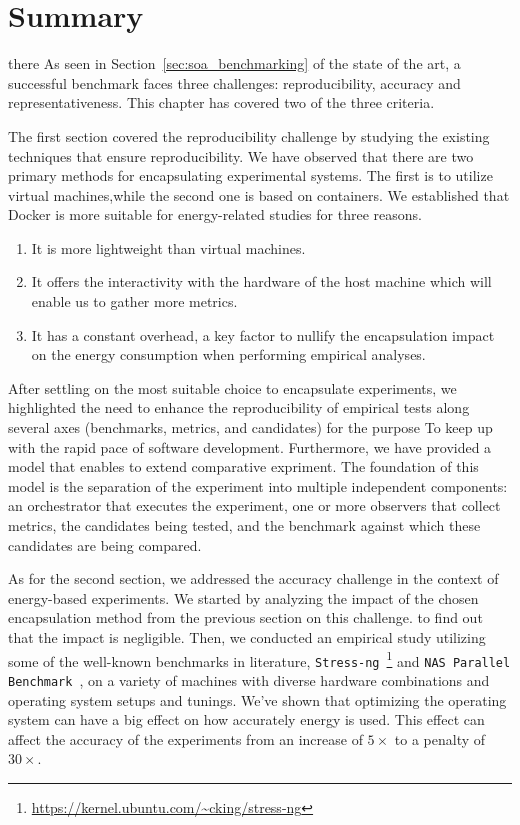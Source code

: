 \section{Summary}
there As seen in Section~\cref{sec:soa_benchmarking} of the state of the art, a successful benchmark faces three challenges: reproducibility, accuracy and representativeness. 
This chapter has covered two of the three criteria.

The first section covered the reproducibility challenge by studying the existing techniques that ensure reproducibility. We have observed that there are two primary methods for encapsulating experimental systems. The first is to utilize virtual machines,while the second one is based on containers. We established that Docker is more suitable for energy-related studies for three reasons.

\begin{enumerate}
    \item It is more lightweight than virtual machines.
    \item It offers the interactivity with the hardware of the host machine which will enable us to gather more metrics.
    \item It has a constant overhead, a key factor to nullify the encapsulation impact on the energy consumption when performing empirical analyses.
\end{enumerate}

After settling on the most suitable choice to encapsulate experiments, we highlighted the need to enhance the reproducibility of empirical tests along several axes (benchmarks, metrics, and candidates) for the purpose To keep up with the rapid pace of software development. 
Furthermore, we have provided a model that enables to extend comparative expriment.
The foundation of this model is the separation of the experiment into multiple independent components: an orchestrator that executes the experiment, one or more observers that collect metrics, the candidates being tested, and the benchmark against which these candidates are being compared.

As for the second section, we addressed the accuracy challenge in the context of energy-based experiments.
We started by analyzing the impact of the chosen encapsulation method from the previous section on this challenge. to find out that the impact is negligible.
Then, we conducted an empirical study utilizing some of the well-known benchmarks in literature, \texttt{Stress-ng}~\footnote{\url{https://kernel.ubuntu.com/~cking/stress-ng}} and \texttt{NAS Parallel Benchmark}~\cite{Bailey:1991:NPB:125826.125925}, on a variety of machines with diverse hardware combinations and operating system setups and tunings. We've shown that optimizing the operating system can have a big effect on how accurately energy is used. This effect can affect the accuracy of the experiments  from an increase of $5\times$ to a penalty of $30\times$.

